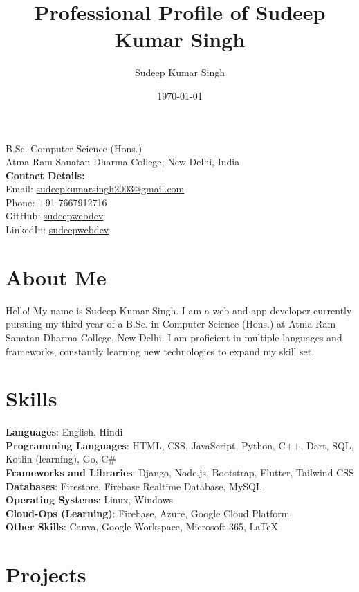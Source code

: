 \documentclass[12pt, a4paper]{article}
\title{\textbf{Professional Profile of Sudeep Kumar Singh}}
\author{Sudeep Kumar Singh}
\date{\today}
\newcommand{\address}{B.Sc. Computer Science (Hons.) \\ Atma Ram Sanatan Dharma College, New Delhi, India}
\begin{document}
\maketitle
\begin{center}
    \address \\
    \vspace{0.5cm}
    \textbf{Contact Details:} \\
    Email: \href{mailto:sudeepkumarsingh2003@gmail.com}{sudeepkumarsingh2003@gmail.com} \\
    Phone: +91 7667912716 \\
    GitHub: \href{https://github.com/sudeepwebdev}{sudeepwebdev} \\
    LinkedIn: \href{https://linkedin.com/in/sudeepwebdev}{sudeepwebdev}
\end{center}


\section*{About Me}

Hello! My name is Sudeep Kumar Singh. I am a web and app developer currently pursuing my third year of a B.Sc. in Computer Science (Hons.) at Atma Ram Sanatan Dharma College, New Delhi. I am proficient in multiple languages and frameworks, constantly learning new technologies to expand my skill set.

\section*{Skills}

\textbf{Languages}: English, Hindi \\
\textbf{Programming Languages}: HTML, CSS, JavaScript, Python, C++, Dart, SQL, Kotlin (learning), Go, C\# \\
\textbf{Frameworks and Libraries}: Django, Node.js, Bootstrap, Flutter, Tailwind CSS \\
\textbf{Databases}: Firestore, Firebase Realtime Database, MySQL \\
\textbf{Operating Systems}: Linux, Windows \\
\textbf{Cloud-Ops (Learning)}: Firebase, Azure, Google Cloud Platform \\
\textbf{Other Skills}: Canva, Google Workspace, Microsoft 365, LaTeX

\section*{Projects}
\end{document}
